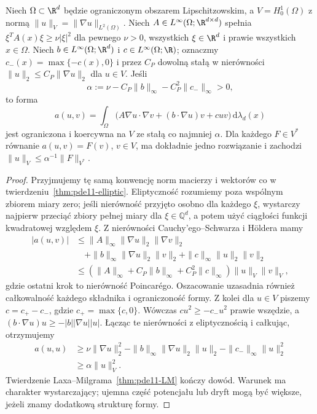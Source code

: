 \begin{twierdzenie}
\label{thm:pde11-lower-order}
Niech $\Omega\subset\R^d$ będzie ograniczonym obszarem
Lipschitzowskim, a $V=H_0^1(\Omega)$ z normą
$\|u\|_V=\|\nabla u\|_{L^2(\Omega)}$. Niech
$A\in L^\infty(\Omega;\R^{d\times d})$ spełnia
$\xi^TA(x)\xi\ge\nu|\xi|^2$ dla pewnego $\nu>0$,
wszystkich $\xi\in\R^d$ i prawie wszystkich $x\in\Omega$.
Niech $b\in L^\infty(\Omega;\R^d)$ i
$c\in L^\infty(\Omega;\R)$; oznaczmy
$c_-(x)=\max\{-c(x),0\}$ i przez $C_P$ dowolną
stałą w nierówności $\|u\|_2\le C_P\|\nabla u\|_2$
dla $u\in V$. Jeśli
\[
\alpha:=\nu-C_P\|b\|_\infty-C_P^2\|c_-\|_\infty>0,
\]
to forma
\[
 a(u,v)=\int_\Omega\bigl(A\nabla u\cdot\nabla v
 +(b\cdot\nabla u)v+cuv\bigr)\,\mathrm d\lambda_d(x)
\]
jest ograniczona i koercywna na $V$ ze stałą co
najmniej $\alpha$. Dla każdego $F\in V^*$ równanie
$a(u,v)=F(v)$, $v\in V$, ma dokładnie jedno rozwiązanie
i zachodzi $\|u\|_V\le\alpha^{-1}\|F\|_{V^*}$.
\end{twierdzenie}
\begin{proof}
Przyjmujemy tę samą konwencję norm macierzy i wektorów
co w twierdzeniu~\ref{thm:pde11-elliptic}.
Eliptyczność rozumiemy poza wspólnym zbiorem miary zero;
jeśli nierówność przyjęto osobno dla każdego $\xi$,
wystarczy najpierw przeciąć zbiory pełnej miary
dla $\xi\in\mathbb Q^d$, a potem użyć ciągłości
funkcji kwadratowej względem $\xi$.
Z nierówności Cauchy'ego--Schwarza i Höldera mamy
\[
 \begin{aligned}
 |a(u,v)|&\le\|A\|_\infty\|\nabla u\|_2\|\nabla v\|_2\\
 &\quad+\|b\|_\infty\|\nabla u\|_2\|v\|_2
       +\|c\|_\infty\|u\|_2\|v\|_2\\
 &\le(\|A\|_\infty+C_P\|b\|_\infty
       +C_P^2\|c\|_\infty)\|u\|_V\|v\|_V,
 \end{aligned}
\]
gdzie ostatni krok to nierówność Poincarégo.
Oszacowanie uzasadnia również całkowalność każdego
składnika i ograniczoność formy.
Z kolei dla $u\in V$ piszemy
$c=c_+-c_-$, gdzie $c_+=\max\{c,0\}$.
Wówczas $cu^2\ge-c_-u^2$ prawie wszędzie,
a $(b\cdot\nabla u)u\ge-|b||\nabla u||u|$.
Łącząc te nierówności z eliptycznością i całkując,
otrzymujemy
\begin{align*}
 a(u,u)&\ge\nu\|\nabla u\|_2^2
 -\|b\|_\infty\|\nabla u\|_2\|u\|_2
 -\|c_-\|_\infty\|u\|_2^2\\
 &\ge\alpha\|u\|_V^2.
\end{align*}
Twierdzenie Laxa--Milgrama~\ref{thm:pde11-LM}
kończy dowód. Warunek ma charakter wystarczający;
ujemna część potencjału lub dryft mogą być większe,
jeżeli znamy dodatkową strukturę formy.
\end{proof}

